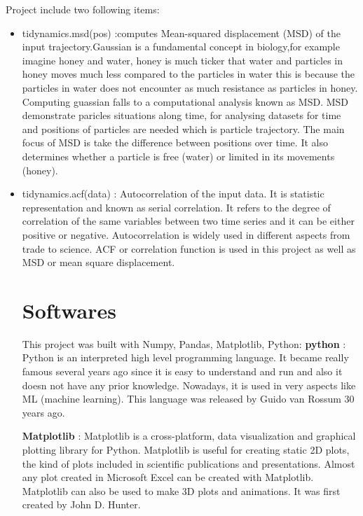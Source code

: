 \documentclass[12pt, a4paper, twoside]{report}
\begin{document}
Project include two following items:\newline
\begin{itemize}
  \item tidynamics.msd(pos) :computes Mean-squared displacement (MSD) of the input trajectory.Gaussian is a fundamental concept in biology,for example imagine honey and water, honey is much ticker that water and particles in honey moves much less compared to the particles in water this is because the particles in water does not encounter as much resistance as particles in honey. Computing guassian falls to a computational analysis known as MSD. MSD demonstrate paricles situations along time, for analysing datasets for time and positions of particles are needed which is particle trajectory. The main focus of MSD is take the difference between positions over time. It also determines whether a particle is free (water) or limited in its movements (honey).\newline 
  \item tidynamics.acf(data) : Autocorrelation of the input data. It is statistic representation and known as serial correlation. It refers to the degree of correlation of the same variables between two time series and it can be either positive or negative. Autocorrelation is widely used in different aspects from trade to science. ACF or correlation function is used in this project as well as MSD or mean square displacement.\newpage 

\section{Softwares}
This project was built with Numpy, Pandas, Matplotlib, Python:\newline
\textbf{python} : Python is an interpreted high level programming language. It became really famous several years ago since it is easy to understand and run and also it doesn not have any prior knowledge. Nowadays, it is used in very aspects like ML (machine learning). This language was released by Guido van Rossum 30 years ago.\newline

\textbf{Matplotlib} : Matplotlib is a cross-platform, data visualization and graphical plotting library for Python. Matplotlib is useful for creating static 2D plots, the kind of plots included in scientific publications and presentations. Almost any plot created in Microsoft Excel can be created with Matplotlib. Matplotlib can also be used to make 3D plots and animations. It was first created by  John D. Hunter.\newline


\end{itemize}
\end{document}
